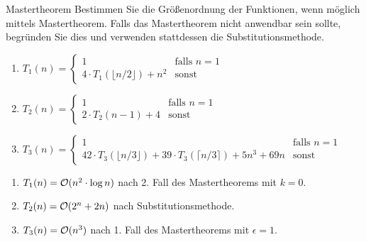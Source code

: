 \documentclass{article}
\begin{document}
\begin{exercise}{Mastertheorem}
  Bestimmen Sie die Größenordnung der Funktionen, wenn möglich mittels Mastertheorem. Falls das Mastertheorem nicht anwendbar sein sollte, begründen Sie dies und verwenden stattdessen die Substitutionsmethode.
  \begin{enumerate}
    \item $T_1(n) = \begin{cases}
              1                                      & \text{falls } n = 1 \\
              4 \cdot T_1(\lfloor n/2 \rfloor) + n^2 & \text{sonst}
            \end{cases}$
    \item $T_2(n) = \begin{cases}
              1                    & \text{falls } n = 1 \\
              2 \cdot T_2(n-1) + 4 & \text{sonst}
            \end{cases}$
    \item $T_3(n) = \begin{cases}
              1                                                                                & \text{falls } n = 1 \\
              42 \cdot T_3(\lfloor n/3 \rfloor) + 39 \cdot T_3(\lceil n/3 \rceil) + 5n^3 + 69n & \text{sonst}
            \end{cases}$
  \end{enumerate}

  \begin{solution}
    \begin{enumerate}
      \item $T_1(n) = \mathcal{O}(n^2\cdot \log{n})$ nach 2. Fall des Mastertheorems mit $k=0$.
      \item $T_2(n) = \mathcal{O}(2^n+2n)$ nach Substitutionsmethode.
      \item $T_3(n) = \mathcal{O}(n^3)$ nach 1. Fall des Mastertheorems mit $\epsilon=1$.
    \end{enumerate}
  \end{solution}
\end{exercise}
\end{document}
